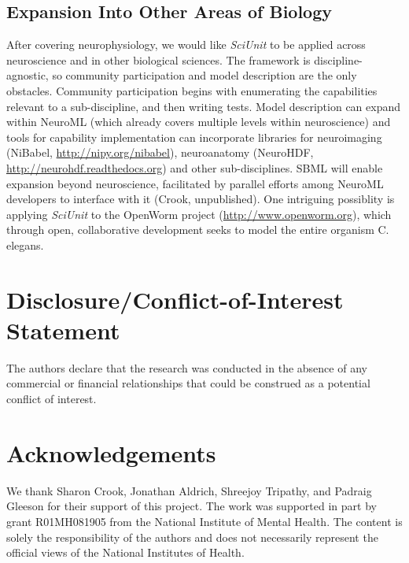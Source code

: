 \documentclass{frontiersSCNS}
\begin{document}
\subsection{Expansion Into Other Areas of Biology}
After covering neurophysiology, we would like \textit{SciUnit} to be applied across neuroscience and in other biological sciences. 
The framework is discipline-agnostic, so community participation and model description are the only obstacles. 
Community participation begins with enumerating the capabilities relevant to a sub-discipline, and then writing tests. 
Model description can expand within NeuroML (which already covers multiple levels within neuroscience) and tools for capability implementation can incorporate libraries for neuroimaging (NiBabel, \url{http://nipy.org/nibabel}), neuroanatomy (NeuroHDF, \url{http://neurohdf.readthedocs.org}) and other sub-disciplines. 
SBML will enable expansion beyond neuroscience, facilitated by parallel efforts among NeuroML developers to interface with it (Crook, unpublished). 
One intriguing possiblity is applying \textit{SciUnit} to the OpenWorm project (\url{http://www.openworm.org}), which through open, collaborative development seeks to model the entire organism C. elegans.  

\section*{Disclosure/Conflict-of-Interest Statement}
The authors declare that the research was conducted in the absence of any commercial or financial relationships that could be construed as a potential conflict of interest.

\section*{Acknowledgements}
We thank Sharon Crook, Jonathan Aldrich, Shreejoy Tripathy, and Padraig Gleeson for their support of this project.  
The work was supported in part by grant R01MH081905 from the National Institute of Mental Health. 
The content is solely the responsibility of the authors and does not necessarily represent the official views of the National Institutes of Health.



%
%
\end{document}
